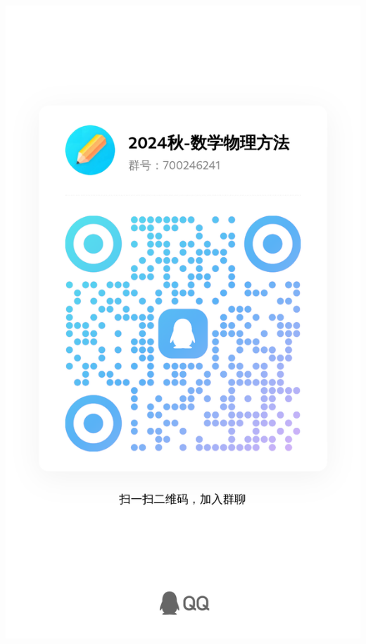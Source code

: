 \documentclass[11pt, a4paper]{article}
\begin{document}
\begin{center} \begin{minipage}{3in}
\begin{flushleft}
	\includegraphics[width=\textwidth]{qrcode.jpg}
\end{flushleft}
\end{minipage}
\end{center}





\end{document}
